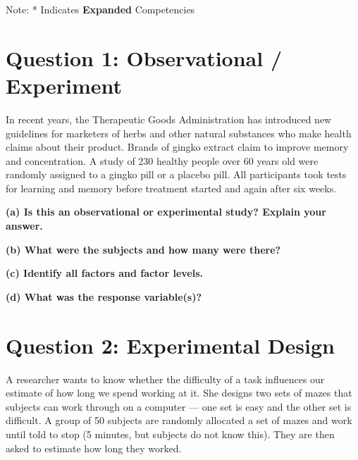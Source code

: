 \documentclass[
  11pt,
  oneside]{scrbook}
\begin{document}
Note: * Indicates \textbf{Expanded} Competencies

\section{Question 1: Observational / Experiment}\label{question-1-observational-experiment}

In recent years, the Therapeutic Goods Administration has introduced new guidelines for marketers of herbs and other natural substances who make health claims about their product. Brands of gingko extract claim to improve memory and concentration. A study of 230 healthy people over 60 years old were randomly assigned to a gingko pill or a placebo pill. All participants took tests for learning and memory before treatment started and again after six weeks.

\textbf{(a) Is this an observational or experimental study? Explain your answer.}

\begin{answerbox}\vspace{3cm}\end{answerbox}

\textbf{(b) What were the subjects and how many were there?}

\begin{answerbox}\vspace{2cm}\end{answerbox}

\textbf{(c) Identify all factors and factor levels.}

\begin{answerbox}\vspace{2cm}\end{answerbox}

\textbf{(d) What was the response variable(s)?}

\begin{answerbox}\vspace{2cm}\end{answerbox}

\section{Question 2: Experimental Design}\label{question-2-experimental-design}

A researcher wants to know whether the difficulty of a task influences our estimate of how long we spend working at it. She designs two sets of mazes that subjects can work through on a computer --- one set is easy and the other set is difficult. A group of 50 subjects are randomly allocated a set of mazes and work until told to stop (5 minutes, but subjects do not know this). They are then asked to estimate how long they worked.
\end{document}
